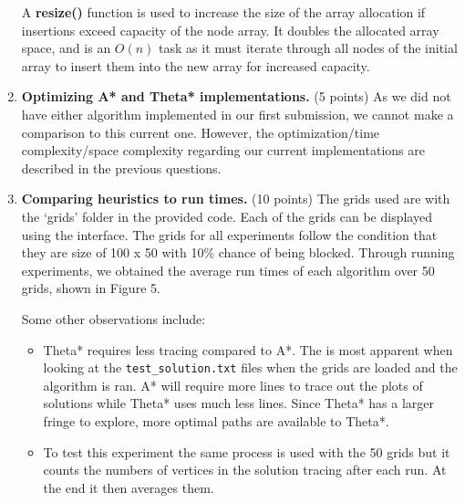 \documentclass[12pt]{article}
\begin{document}
\begin{enumerate}[label=(\alph*)]
  A \textbf{resize()} function is used to increase the size of the array allocation if insertions exceed capacity of the node array. It doubles the allocated array space, and is an $O(n)$ task as it must iterate through all nodes of the initial array to insert them into the new array for increased capacity.

  \item \textbf{Optimizing A* and Theta* implementations.} (5 points) As we did not have either algorithm implemented in our first submission, we cannot make a comparison to this current one. However, the optimization/time complexity/space complexity regarding our current implementations are described in the previous questions.

  \item \textbf{Comparing heuristics to run times.} (10 points) The grids used are with the ‘grids’ folder in the provided code. Each of the grids can be displayed using the interface. The grids for all experiments follow the condition that they are size of 100 x 50 with 10\% chance of being blocked. Through running experiments, we obtained the average run times of each algorithm over 50 grids, shown in Figure 5.

  Some other observations include:
    \begin{itemize}
        \item Theta* requires less tracing compared to A*. The is most apparent when looking at the \texttt{test\_solution.txt} files when the grids are loaded and the algorithm is ran. A* will require more lines to trace out the plots of solutions while Theta* uses much less lines. Since Theta* has a larger fringe to explore, more optimal paths are available to Theta*.
        \item To test this experiment the same process is used with the 50 grids but it counts the numbers of vertices in the solution tracing after each run. At the end it then averages them. 
    \end{itemize}


\end{enumerate}
\end{document}

